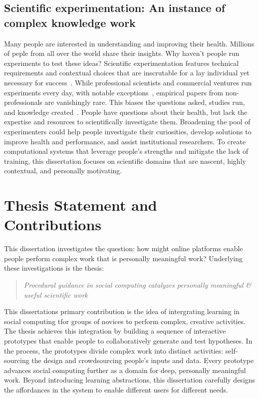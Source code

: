 \subsection{Scientific experimentation: An instance of complex knowledge work}
Many people are interested in understanding and improving their health. Millions of peple from all over the world share their insights. 
Why haven't people run experiments to test these ideas? Scientific experimentation features technical requirements and contextual choices 
that are inscrutable for a lay individual yet necessary for success~\cite{Martin2007}. While 
professional scientists and commercial ventures run experiments every day, with 
notable exceptions~\cite{Cooper2010,DanaLewis}, empirical papers from non-professionals are 
vanishingly rare. This biases the questions asked, studies run, and knowledge 
created~\cite{Henrich2010a}. People have questions about their health, but lack the expertise 
and resources to scientifically investigate them. Broadening the pool of 
experimenters could help people investigate their curiosities, develop solutions 
to improve health and performance, and assist institutional researchers. To create computational systems that leverage people's strengths and mitigate the lack of training, this dissertation focuses on scientific domains that are nascent, highly contextual, and personally motivating.

\section{Thesis Statement and Contributions}
This dissertation investigates the question: how might online platforms enable people perform 
complex work that is personally meaningful work? Underlying these investigations is the thesis:\\
\begin{quote}
\emph{Procedural guidance in social computing catalyzes personally meaningful \& useful scientific work}
\end{quote}

This dissertation\textquotesingle s primary contribution is the idea of intergrating learning in social computing tfor groups of novices to perform complex, creative activities. The thesis achieves this integration by building a sequence of interactive prototypes that enable people to collaboratively generate and test hypotheses. In the process, the prototypes divide complex work into distinct activities: self-sourcing the design and crowdsourcing people's inputs and data. Every prototype advances social computing further as a domain for deep, personally meaningful work. Beyond introducing learning abstractions, this dissertation carefully designs the affordances in the system to enable different users for different needs. 


